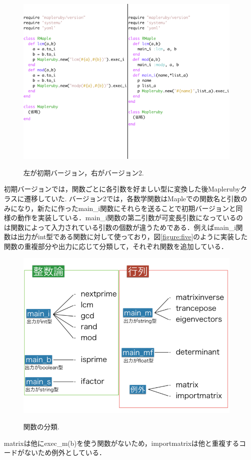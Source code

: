 \begin{figure}[htbp]\begin{center}
\includegraphics[width=12cm,bb= 0 0 937 753]{../figs/./mapleruby_eringi.006.png}
\caption{左が初期バージョン，右がバージョン2.}
\label{figure:four}
\label{default}\end{center}\end{figure}
初期バージョンでは，関数ごとに各引数を好ましい型に変換した後Maplerubyクラスに遷移していた.
バージョン2では，各数学関数はMapleでの関数名と引数のみになり，新たに作ったmain\_i関数にそれらを送ることで初期バージョンと同様の動作を実装している．main\_i関数の第二引数が可変長引数になっているのは関数によって入力されている引数の個数が違うためである．例えばmain\_i関数は出力がint型である関数に対して使っており，図\ref{figure:five}のように実装した関数の重複部分や出力に応じて分類して，それぞれ関数を追加している．
\newpage

\begin{figure}[htbp]\begin{center}
\includegraphics[width=12cm,bb= 0 0 937 753]{../figs/./mapleruby_eringi.007.png}
\caption{関数の分類.}
\label{figure:five}
\label{default}\end{center}\end{figure}
matrixは他にexec\_m(b)を使う関数がないため，importmatrixは他と重複するコードがないため例外としている．

